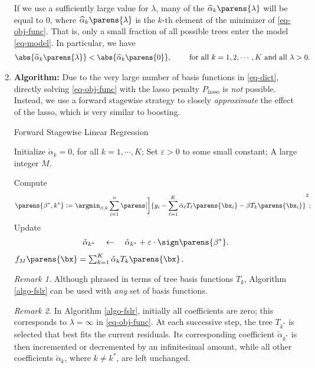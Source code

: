 \documentclass[12pt]{article}
\begin{document}
\begin{enumerate}[label=\textbf{\arabic*.}]
	If we use a sufficiently large value for $\lambda$, many of the $\widehat{\alpha}_k \parens{\lambda}$ will be equal to 0, where $\widehat{\alpha}_k \parens{\lambda}$ is the $k$-th element of the minimizer of \eqref{eq-obj-func}. That is, only a small fraction of all possible trees enter the model \eqref{eq-model}. In particular, we have 
	\begin{align*}
		\abs{\widehat{\alpha}_k \parens{\lambda}} < \abs{\widehat{\alpha}_k \parens{0}}, \qquad \text{ for all } k = 1, 2, \cdots, K \text{ and all } \lambda > 0. 
	\end{align*}
	
	\item \textbf{Algorithm:} Due to the very large number of basis functions in \eqref{eq-dict}, directly solving \eqref{eq-obj-func} with the lasso penalty $P_{\mathrm{lasso}}$ is \emph{not} possible. Instead, we use a forward stagewise strategy to closely \emph{approximate} the effect of the lasso, which is very similar to boosting. 
	
	\begin{minipage}{\linewidth}
	\begin{algorithm}[H]
		\caption{Forward Stagewise Linear Regression}\label{algo-fslr}
		\begin{algorithmic}[1]
			\REQUIRE Initialize $\check{\alpha}_k = 0$, for all $k = 1, \cdots, K$; 
			\REQUIRE Set $\varepsilon > 0$ to some small constant; 
			\REQUIRE A large integer $M$. 
			
			\STATE Compute 
			\begin{align*}
				\parens{\beta^*, k^*} := \argmin_{\beta, k} \sum_{i=1}^n \parens[\bigg]{y_i - \sum_{\ell=1}^K \check{\alpha}_{\ell} T_{\ell} \parens{\bx_i} - \beta T_k \parens{\bx_i}}^2; 
			\end{align*}
			\STATE Update 
			\begin{align*}
				\check{\alpha}_{k^*} \quad \leftarrow \quad \check{\alpha}_{k^*} + \varepsilon \cdot \sign \parens{\beta^*}. 
			\end{align*}
			\ENDFOR
			\RETURN $f_M \parens{\bx} = \sum_{k=1}^K \check{\alpha}_{k} T_k \parens{\bx}$. 
		\end{algorithmic}
	\end{algorithm}
	\end{minipage}
	
	\vspace{10pt}
	
	\textit{Remark 1.} Although phrased in terms of tree basis functions $T_k$, Algorithm \ref{algo-fslr} can be used with \emph{any} set of basis functions. 
	
	\textit{Remark 2.} In Algorithm \ref{algo-fslr}, initially all coefficients are zero; this corresponds to $\lambda = \infty$ in \eqref{eq-obj-func}. At each successive step, the tree $T_{k^*}$ is selected that best fits the current residuals. Its corresponding coefficient $\check{\alpha}_{k^*}$ is then incremented or decremented by an infinitesimal amount, while all other coefficients $\check{\alpha}_{k}$, where $k \neq k^*$, are left unchanged. 

\end{enumerate}
\end{document}
